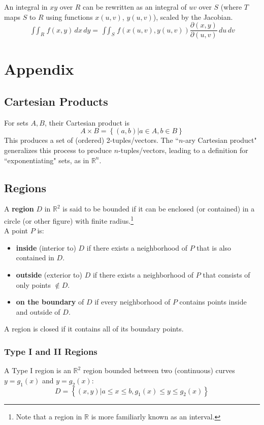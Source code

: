 \documentclass{article}
\begin{document}
An integral in $xy$ over $R$ can be rewritten as an integral of $uv$ over $S$ (where $T$ maps $S$ to $R$ using functions $x(u,v)$, $y(u,v)$), scaled by the Jacobian.
$$\mathop{\int\int}_Rf(x,y)\,dx\,dy=\mathop{\int\int}_Sf(x(u,v), y(u,v))\frac{\partial(x,y)}{\partial(u,v)}\,du\,dv$$

\section{Appendix}
\subsection{Cartesian Products} \label{set-multiplication}
For sets $A, B$, their Cartesian product is $$A \times B = \left\{ (a,b) | a \in A, b \in B\right\}$$
This produces a set of (ordered) 2-tuples/vectors.
The ``$n$-ary Cartesian product" generalizes this process to produce $n$-tuples/vectors, leading to a definition for ``exponentiating" sets, as in $\mathbb{R}^n$.

\subsection{Regions} \label{regions}
A \textbf{region} $D$ in $\mathbb{R}^2$ is said to be bounded if it can be enclosed (or contained) in a circle (or other figure) with finite radius.\footnote{Note that a region in $\mathbb{R}$ is more familiarly known as an interval.}\\
A point $P$ is:
\begin{itemize}
    \item \textbf{inside} (interior to) $D$ if there exists a neighborhood of $P$ that is also contained in $D$.
    \item \textbf{outside} (exterior to) $D$ if there exists a neighborhood of $P$ that consists of only points $\notin D$.
    \item \textbf{on the boundary} of $D$ if every neighborhood of $P$ contains points inside and outside of $D$.
\end{itemize}
A region is closed if it contains all of its boundary points.

\subsubsection{Type I and II Regions}
A Type I region is an $\mathbb{R}^2$ region bounded between two (continuous) curves $y=g_1(x)$ and $y=g_2(x)$:
$$D=\left\{(x,y)|a\le x\le b, g_1(x)\le y\le g_2(x)\right\}$$
\end{document}
